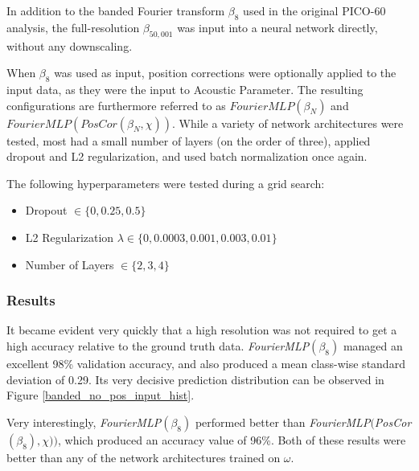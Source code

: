 \documentclass[10pt]{article}
\begin{document}
In addition to the banded Fourier transform $\beta_{8}$ used in the original PICO-60 analysis, the full-resolution $\beta _{50,001}$ was input into a neural network directly, without any downscaling.

When $\beta_{8}$ was used as input, position corrections were optionally applied to the input data, as they were the input to Acoustic Parameter. The resulting configurations are furthermore referred to as $FourierMLP(\beta_{N})$ and \\ $FourierMLP(PosCor(\beta_{N}, \chi))$. While a variety of network architectures were tested, most had a small number of layers (on the order of three), applied dropout and L2 regularization, and used batch normalization once again.

The following hyperparameters were tested during a grid search:
\begin{itemize}
    \item Dropout $\in \{0, 0.25, 0.5\}$
    \item L2 Regularization $\lambda \in \{0, 0.0003, 0.001, 0.003, 0.01\}$
    \item Number of Layers $\in \{2, 3, 4\}$
\end{itemize}

\subsubsection{Results}

It became evident very quickly that a high resolution was not required to get a high accuracy relative to the ground truth data. {\it FourierMLP}$(\beta_{8})$ managed an excellent 98\% validation accuracy, and also produced a mean class-wise standard deviation of 0.29. Its very decisive prediction distribution can be observed in Figure \ref{banded_no_pos_input_hist}.

Very interestingly, {\it FourierMLP}$(\beta_{8})$ performed better than {\it FourierMLP}$(${\it PosCor}$(\beta_{8}), \chi))$, which produced an accuracy value of 96\%. Both of these results were better than any of the network architectures trained on $\omega$.
\end{document}
